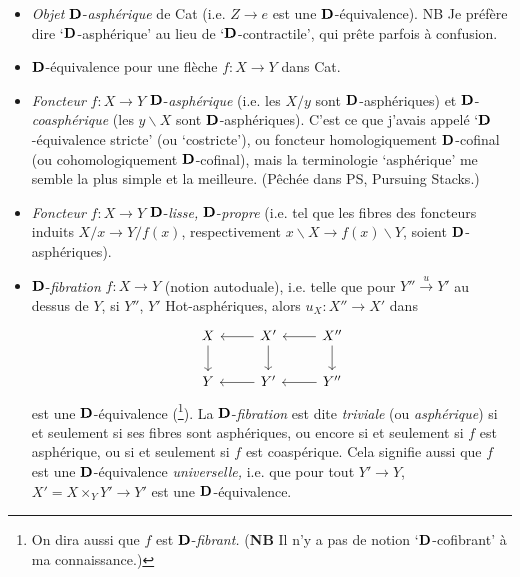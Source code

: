 \begin{itemize}
\item[(i)] \textit{Objet} $\mathbf{D}$-\textit{asphérique} de Cat (i.e. $Z \longrightarrow e$ est une $\mathbf{D}$-équivalence). NB Je préfère dire ‘$\mathbf{D}$-asphérique’ au lieu de ‘$\mathbf{D}$-contractile’, qui prête parfois à confusion.

\item[\textcircled{ii}] $\mathbf{D}$-équivalence pour une flèche $f : X \longrightarrow Y$ dans Cat.

\item[(iii)] \textit{Foncteur} $f : X \longrightarrow Y$ $\mathbf{D}$-\textit{asphérique} (i.e. les $X/y$ sont $\mathbf{D}$-asphériques) et $\mathbf{D}$-\textit{coasphérique} (les $y\backslash X$ sont $\mathbf{D}$-asphériques). C’est ce que j’avais appelé ‘$\mathbf{D}$-équivalence stricte’ (ou ‘costricte’), ou foncteur homologiquement $\mathbf{D}$-cofinal (ou cohomologiquement $\mathbf{D}$-cofinal), mais la terminologie ‘asphérique’ me semble la plus simple et la meilleure. (Pêchée dans PS, Pursuing Stacks.)

\item[(iv)] \textit{Foncteur} $f : X \longrightarrow Y$ $\mathbf{D}$-\textit{lisse,} $\mathbf{D}$-\textit{propre} (i.e. tel que les fibres des foncteurs induits $X/x \longrightarrow Y/f(x)$, respectivement $x\backslash X \longrightarrow f(x)\backslash Y$, soient $\mathbf{D}$-asphériques).

\item[(v)] $\mathbf{D}$-\textit{fibration} $f : X \longrightarrow Y$ (notion autoduale), i.e. telle que pour $Y'' \xrightarrow{u} Y'$ au dessus de $Y$, si $Y''$, $Y'$ Hot-asphériques, alors $u_X : X'' \longrightarrow X'$ dans
\[
\begin{tikzcd}
X \arrow[d] & X' \arrow[l] \arrow[d] & X'' \arrow[l] \arrow[d] \\
Y & Y' \arrow[l] & Y'' \arrow[l]
\end{tikzcd}
\]
est une $\mathbf{D}$-équivalence (\footnote{On dira aussi que $f$ est $\mathbf{D}$-\textit{fibrant.} (\textbf{NB} Il n’y a pas de notion ‘$\mathbf{D}$-cofibrant’ à ma connaissance.)}). La $\mathbf{D}$-\textit{fibration} est dite \textit{triviale} (ou \textit{asphérique}) si et seulement si ses fibres sont asphériques, ou encore si et seulement si $f$ est asphérique, ou si et seulement si $f$ est coaspérique. Cela signifie aussi que $f$ est une $\mathbf{D}$-équivalence \textit{universelle,} %
i.e. que pour tout $Y' \longrightarrow Y$, $X' = X \times_Y Y' \longrightarrow Y'$ est une $\mathbf{D}$-équivalence.


\end{itemize}
